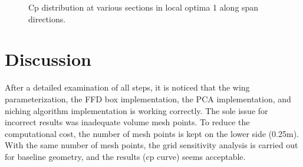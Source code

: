 \begin{figure}[!htbp]
{    
    }
    \caption{Cp distribution at various sections in local optima 1 along span directions.}
    \label{cp_curve in span direction}
\end{figure}



\section{Discussion}

After a detailed examination of all steps, it is noticed that the wing parameterization, the FFD box implementation, the PCA implementation, and niching algorithm implementation is working correctly. The sole issue for incorrect results was inadequate volume mesh points. To reduce the computational cost, the number of mesh points is kept on the lower side (0.25m). With the same number of mesh points, the grid sensitivity analysis is carried out for baseline geometry, and the results (cp curve) seems acceptable. 

